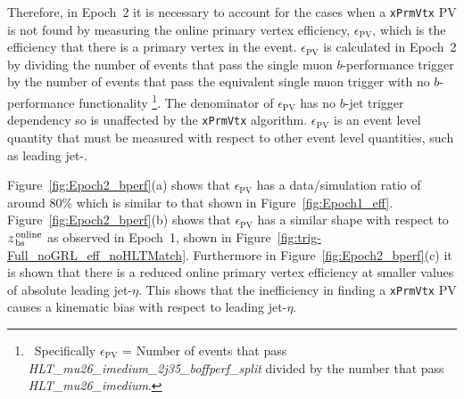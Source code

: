 Therefore, in Epoch~2 it is necessary to account for the cases when a \verb|xPrmVtx| PV is not found
by measuring the online primary vertex efficiency, $\epsilon_{\text{PV}}$,
which is the efficiency that there is a primary vertex in the event.
$\epsilon_{\text{PV}}$ is calculated in Epoch~2 by dividing the number of events that pass the single muon $b$-performance trigger
by the number of events that pass the equivalent single muon trigger with no $b$-performance functionality
\footnote{\ Specifically $\epsilon_{\text{PV}}$ = Number of events that pass \textit{HLT\_mu26\_imedium\_2j35\_boffperf\_split} divided by the number that pass \textit{HLT\_mu26\_imedium}.}.
The denominator of $\epsilon_{\text{PV}}$ has no $b$-jet trigger dependency so is unaffected by the \verb|xPrmVtx| algorithm.
$\epsilon_{\text{PV}}$ is an event level quantity that must be measured with respect to other event level quantities, such as leading jet-\pT.

Figure~\ref{fig:Epoch2_bperf}(a) shows that $\epsilon_{\text{PV}}$ has a data/simulation ratio of around 80\%  which is similar to that shown in Figure~\ref{fig:Epoch1_eff}.
Figure~\ref{fig:Epoch2_bperf}(b) shows that $\epsilon_{\text{PV}}$ has a similar shape with respect to  $z_{\,\text{bs}}^{\text{\,online}}$ as observed in Epoch~1,
shown in Figure~\ref{fig:trig-Full_noGRL_eff_noHLTMatch}.
Furthermore in Figure~\ref{fig:Epoch2_bperf}(c) it is shown that there is a reduced online primary vertex efficiency at smaller values of absolute leading jet-$\eta$.
This shows that the inefficiency in finding a \verb|xPrmVtx| PV causes a kinematic bias with respect to leading jet-$\eta$. %

